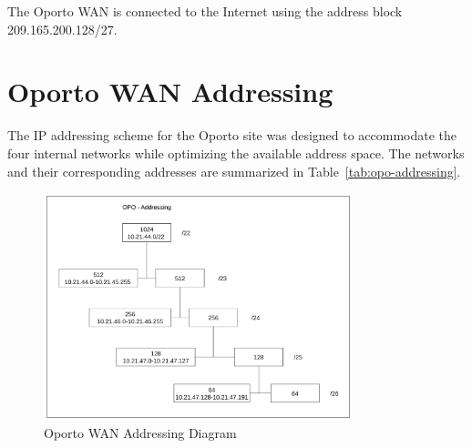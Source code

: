 The Oporto \ac{WAN} is connected to the Internet using the address block 209.165.200.128/27.

\section{Oporto \ac{WAN} Addressing}

The \ac{IP} addressing scheme for the Oporto site was designed to accommodate the four internal networks while optimizing the available address space. The networks and their corresponding addresses are summarized in Table~\ref{tab:opo-addressing}.

\begin{table}[h]
\centering
{}
\caption{Oporto \ac{WAN} \ac{IP} addressing scheme.}
\label{tab:opo-addressing}
\end{table}


\begin{figure}[!htb]
\centering
\includegraphics[width=0.8\textwidth]{figures/opo-addressing.png}
\caption{Oporto \ac{WAN} Addressing Diagram\cite{t3a_ipv4_subneting_dhcp}}
\label{fig:opo-addressing}
\end{figure}


